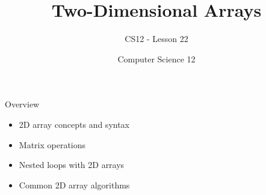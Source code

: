 \documentclass[10pt]{beamer}
\title{Two-Dimensional Arrays}
\subtitle{CS12 - Lesson 22}
\author{Computer Science 12}
\date{}
\begin{document}
\begin{frame}
    \titlepage
\end{frame}

\begin{frame}{Overview}
    \begin{itemize}
        \item 2D array concepts and syntax
        \item Matrix operations
        \item Nested loops with 2D arrays
        \item Common 2D array algorithms
    \end{itemize}
\end{frame}

\end{document}
